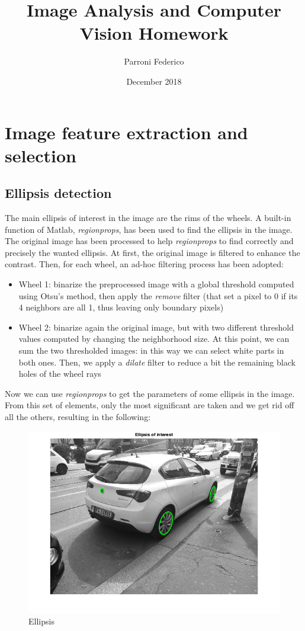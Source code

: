 \documentclass{article}
\title{Image Analysis and Computer Vision Homework}
\author{Parroni Federico}
\date{December 2018}
\begin{document}
\maketitle

\vspace{1cm}
\tableofcontents

\newpage
\section{Image feature extraction and selection}

\subsection{Ellipsis detection}
The main ellipsis of interest in the image are the rims of the wheels. A built-in function of Matlab, \textit{regionprops}, has been used to find the ellipsis in the image.
The original image has been processed to help \textit{regionprops} to find correctly and precisely the wanted ellipsis.
At first, the original image is filtered to enhance the contrast. Then, for each wheel, an ad-hoc filtering process has been adopted:
\begin{itemize}
    \item Wheel 1: binarize the preprocessed image with a global threshold computed using Otsu's method, then apply the \textit{remove} filter (that set a pixel to 0 if its 4 neighbors are all 1, thus leaving only boundary pixels)
    \item Wheel 2: binarize again the original image, but with two different threshold values computed by changing the neighborhood size. At this point, we can sum the two thresholded images: in this way we can select white parts in both ones. Then, we apply a \textit{dilate} filter to reduce a bit the remaining black holes of the wheel rays
\end{itemize}
Now we can use \textit{regionprops} to get the parameters of some ellipsis in the image. From this set of elements, only the most significant are taken and we get rid off all the others, resulting in the following:
\begin{figure}[h!]
\centering
\includegraphics[scale=0.6]{images/homework_08.png}
\caption{Ellipsis}
\label{fig:ellipsis}
\end{figure}
\end{document}
